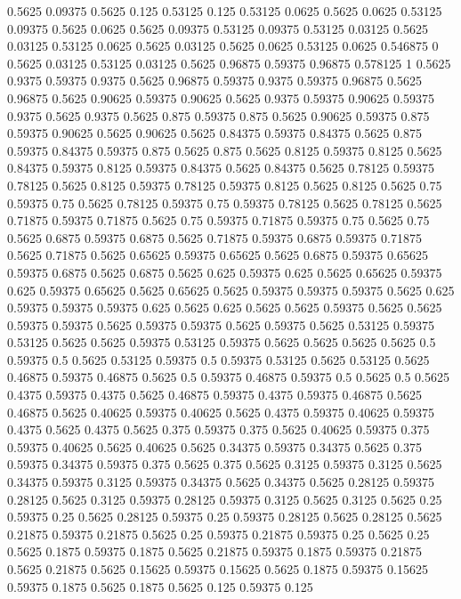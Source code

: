 0.5625 0.09375
0.5625 0.125
0.53125 0.125
0.53125 0.0625
0.5625 0.0625
0.53125 0.09375
0.5625 0.0625
0.5625 0.09375
0.53125 0.09375
0.53125 0.03125
0.5625 0.03125
0.53125 0.0625
0.5625 0.03125
0.5625 0.0625
0.53125 0.0625
0.546875 0
0.5625 0.03125
0.53125 0.03125
0.5625 0.96875
0.59375 0.96875
0.578125 1
0.5625 0.9375
0.59375 0.9375
0.5625 0.96875
0.59375 0.9375
0.59375 0.96875
0.5625 0.96875
0.5625 0.90625
0.59375 0.90625
0.5625 0.9375
0.59375 0.90625
0.59375 0.9375
0.5625 0.9375
0.5625 0.875
0.59375 0.875
0.5625 0.90625
0.59375 0.875
0.59375 0.90625
0.5625 0.90625
0.5625 0.84375
0.59375 0.84375
0.5625 0.875
0.59375 0.84375
0.59375 0.875
0.5625 0.875
0.5625 0.8125
0.59375 0.8125
0.5625 0.84375
0.59375 0.8125
0.59375 0.84375
0.5625 0.84375
0.5625 0.78125
0.59375 0.78125
0.5625 0.8125
0.59375 0.78125
0.59375 0.8125
0.5625 0.8125
0.5625 0.75
0.59375 0.75
0.5625 0.78125
0.59375 0.75
0.59375 0.78125
0.5625 0.78125
0.5625 0.71875
0.59375 0.71875
0.5625 0.75
0.59375 0.71875
0.59375 0.75
0.5625 0.75
0.5625 0.6875
0.59375 0.6875
0.5625 0.71875
0.59375 0.6875
0.59375 0.71875
0.5625 0.71875
0.5625 0.65625
0.59375 0.65625
0.5625 0.6875
0.59375 0.65625
0.59375 0.6875
0.5625 0.6875
0.5625 0.625
0.59375 0.625
0.5625 0.65625
0.59375 0.625
0.59375 0.65625
0.5625 0.65625
0.5625 0.59375
0.59375 0.59375
0.5625 0.625
0.59375 0.59375
0.59375 0.625
0.5625 0.625
0.5625 0.5625
0.59375 0.5625
0.5625 0.59375
0.59375 0.5625
0.59375 0.59375
0.5625 0.59375
0.5625 0.53125
0.59375 0.53125
0.5625 0.5625
0.59375 0.53125
0.59375 0.5625
0.5625 0.5625
0.5625 0.5
0.59375 0.5
0.5625 0.53125
0.59375 0.5
0.59375 0.53125
0.5625 0.53125
0.5625 0.46875
0.59375 0.46875
0.5625 0.5
0.59375 0.46875
0.59375 0.5
0.5625 0.5
0.5625 0.4375
0.59375 0.4375
0.5625 0.46875
0.59375 0.4375
0.59375 0.46875
0.5625 0.46875
0.5625 0.40625
0.59375 0.40625
0.5625 0.4375
0.59375 0.40625
0.59375 0.4375
0.5625 0.4375
0.5625 0.375
0.59375 0.375
0.5625 0.40625
0.59375 0.375
0.59375 0.40625
0.5625 0.40625
0.5625 0.34375
0.59375 0.34375
0.5625 0.375
0.59375 0.34375
0.59375 0.375
0.5625 0.375
0.5625 0.3125
0.59375 0.3125
0.5625 0.34375
0.59375 0.3125
0.59375 0.34375
0.5625 0.34375
0.5625 0.28125
0.59375 0.28125
0.5625 0.3125
0.59375 0.28125
0.59375 0.3125
0.5625 0.3125
0.5625 0.25
0.59375 0.25
0.5625 0.28125
0.59375 0.25
0.59375 0.28125
0.5625 0.28125
0.5625 0.21875
0.59375 0.21875
0.5625 0.25
0.59375 0.21875
0.59375 0.25
0.5625 0.25
0.5625 0.1875
0.59375 0.1875
0.5625 0.21875
0.59375 0.1875
0.59375 0.21875
0.5625 0.21875
0.5625 0.15625
0.59375 0.15625
0.5625 0.1875
0.59375 0.15625
0.59375 0.1875
0.5625 0.1875
0.5625 0.125
0.59375 0.125

